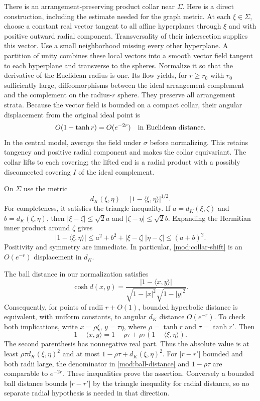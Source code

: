 There is an arrangement-preserving product collar near $\Sigma$.
Here is a direct construction, including the estimate needed for
the graph metric.  At each $\xi\in\Sigma$, choose a constant real
vector tangent to all affine hyperplanes through $\xi$ and with
positive outward radial component.  Transversality of their
intersection supplies this vector.  Use a small neighborhood
missing every other hyperplane.  A partition of unity combines
these local vectors into a smooth vector field tangent to each
hyperplane and transverse to the spheres.  Normalize it so that
the derivative of the Euclidean radius is one.  Its flow yields,
for $r\ge r_0$ with $r_0$ sufficiently large, diffeomorphisms
between the ideal arrangement complement and the complement on
the radius-$r$ sphere.  They preserve all arrangement strata.
Because the vector field is bounded on a compact collar, their
angular displacement from the original ideal point is
\begin{equation}\label{mod:collar-shift}
 O(1-\tanh r)=O(e^{-2r})
 \quad\hbox{in Euclidean distance.}
\end{equation}
In the central model, average the field under $\sigma$ before
normalizing.  This retains tangency and positive radial component
and makes the collar equivariant.  The collar lifts to each
covering; the lifted end is a radial product with a possibly
disconnected covering $I$ of the ideal complement.

On $\Sigma$ use the metric
\[
 d_K(\xi,\eta)=|1-\langle\xi,\eta\rangle|^{1/2}.
\]
For completeness, it satisfies the triangle inequality.  If
$a=d_K(\xi,\zeta)$ and $b=d_K(\zeta,\eta)$, then
$|\xi-\zeta|\le\sqrt2a$ and
$|\zeta-\eta|\le\sqrt2b$.  Expanding the Hermitian inner product
around $\zeta$ gives
\[
 |1-\langle\xi,\eta\rangle|
 \le a^2+b^2+|\xi-\zeta|\,|\eta-\zeta|
 \le(a+b)^2.
\]
Positivity and symmetry are immediate.  In particular,
\eqref{mod:collar-shift} is an $O(e^{-r})$ displacement in $d_K$.

The ball distance in our normalization satisfies
\begin{equation}\label{mod:ball-distance}
 \cosh d(x,y)=
 \frac{|1-\langle x,y\rangle|}
 {\sqrt{1-|x|^2}\sqrt{1-|y|^2}}.
\end{equation}
Consequently, for points of radii $r+O(1)$, bounded hyperbolic
distance is equivalent, with uniform constants, to angular
$d_K$ distance $O(e^{-r})$.  To check both implications, write
$x=\rho\xi$, $y=\tau\eta$, where $\rho=\tanh r$ and
$\tau=\tanh r'$.  Then
\[
 1-\langle x,y\rangle
 =1-\rho\tau+\rho\tau(1-\langle\xi,\eta\rangle).
\]
The second parenthesis has nonnegative real part.  Thus the
absolute value is at least $\rho\tau d_K(\xi,\eta)^2$ and at most
$1-\rho\tau+d_K(\xi,\eta)^2$.  For $|r-r'|$ bounded and both
radii large, the denominator in \eqref{mod:ball-distance} and
$1-\rho\tau$ are comparable to $e^{-2r}$.  These inequalities
prove the assertion.  Conversely a bounded ball distance bounds
$|r-r'|$ by the triangle inequality for radial distance, so no
separate radial hypothesis is needed in that direction.

